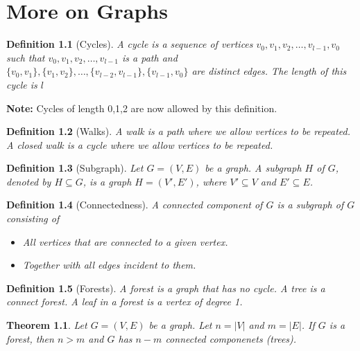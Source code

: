 \documentclass[openany]{report}
\newtheorem{theorem}{Theorem}[section]
\newtheorem{definition}{Definition}[section]
\begin{document}
\chapter{More on Graphs}
\begin{definition}[Cycles]
    A \emph{cycle} is a sequence of vertices $v_0, v_1,v_2, \ldots, v_{l-1}, v_0$ such that $v_0, v_1,v_2, \ldots, v_{l-1}$ is a path and $\{v_0,v_1\},\{v_1,v_2\}, \ldots,\{v_{l-2},v_{l-1}\}, \{v_{l-1}, v_0\}$ are distinct edges. The \emph{length} of this cycle is $l$
\end{definition}
\begin{center}
    \textbf{Note:} Cycles of length 0,1,2 are now allowed by this definition.
\end{center}
\begin{definition}[Walks]
    A \emph{walk} is a path where we allow vertices to be repeated. A \emph{closed walk} is a cycle where we allow vertices to be repeated.
\end{definition}
\begin{definition}[Subgraph]
    Let $G = (V,E)$ be a graph. A \emph{subgraph} $H$ of $G$, denoted by $H \subseteq G$, is a graph $H = (V', E')$, where $V' \subseteq V$ and $E' \subseteq E$.
\end{definition}
\begin{definition}[Connectedness]
    A \emph{connected component} of $G$ is a subgraph of $G$ consisting of 
    \begin{itemize}
        \item All vertices that are connected to a given vertex.
        \item Together with all edges incident to them.
    \end{itemize}
\end{definition}
\begin{definition}[Forests]
    A \emph{forest} is a graph that has no cycle. A \emph{tree} is a connect forest. A \emph{leaf} in a forest is a vertex of degree 1.
\end{definition}
\begin{theorem}
    Let $G = (V,E)$ be a graph. Let $n = |V|$ and $m = |E|$. If $G$ is a forest, then $n > m$ and $G$ has $n-m$ connected componenets (trees).
\end{theorem}
\end{document}
